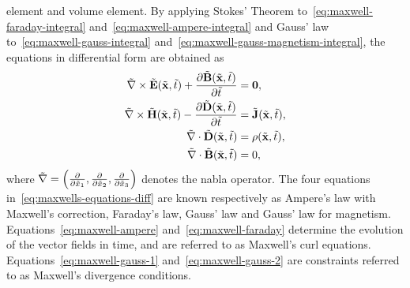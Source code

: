 element and volume element.
By applying Stokes' Theorem to~\eqref{eq:maxwell-faraday-integral}
and~\eqref{eq:maxwell-ampere-integral} and Gauss' law
to~\eqref{eq:maxwell-gauss-integral}
and~\eqref{eq:maxwell-gauss-magnetism-integral}, the equations in differential
form are obtained as
\begin{subequations}
  \label{eq:maxwells-equations-diff}
  \begin{align}
    \tilde{\nabla} \times \tilde{\mathbf{E}}(\tilde{\mathbf{x}},\tilde{t}) + \frac{\partial \tilde{\mathbf{B}}(\tilde{\mathbf{x}}, \tilde{t})}{\partial \tilde{t} }&= \mathbf{0}, \label{eq:maxwell-faraday} \\
    \tilde{\nabla} \times \tilde{\mathbf{H}}(\tilde{\mathbf{x}},\tilde{t}) - \frac{\partial \tilde{\mathbf{D}}(\tilde{\mathbf{x}}, \tilde{t})}{\partial \tilde{t} }&= \tilde{\mathbf{J}}(\tilde{\mathbf{x}},\tilde{t}), \label{eq:maxwell-ampere} \\
    \tilde{\nabla} \cdot \tilde{\mathbf{D}} (\tilde{\mathbf{x}},\tilde{t}) &= \rho(\tilde{\mathbf{x}},\tilde{t}), \label{eq:maxwell-gauss-1} \\
    \tilde{\nabla} \cdot \tilde{\mathbf{B}} (\tilde{\mathbf{x}},\tilde{t}) &= 0, \label{eq:maxwell-gauss-2} 
  \end{align}
\end{subequations}
where $\tilde{\nabla} = \left( \frac{\partial }{\partial \tilde{x}_1}, \frac{\partial }{\partial \tilde{x}_2}, \frac{\partial }{\partial \tilde{x}_3} \right)$ denotes the nabla operator. The four equations in~\eqref{eq:maxwells-equations-diff} are known respectively as Ampere's law with Maxwell's correction, Faraday's law, Gauss' law and Gauss' law for magnetism. Equations~\eqref{eq:maxwell-ampere} and~\eqref{eq:maxwell-faraday} determine the evolution of the vector fields in time, and are referred to as Maxwell's curl equations. Equations~\eqref{eq:maxwell-gauss-1} and~\eqref{eq:maxwell-gauss-2} are constraints referred to as Maxwell's divergence conditions.

